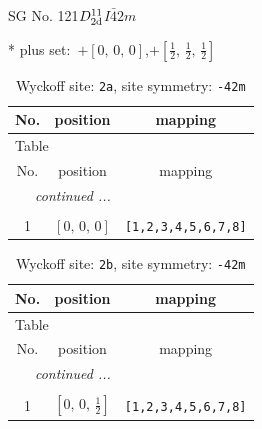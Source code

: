 \documentclass[fleqn,8pt]{jsarticle}
\begin{document}
\setcounter{MaxMatrixCols}{32}

\renewcommand{\tablename}{Table~}
\renewcommand{\figurename}{Figure~}
\begin{center}
\LARGE
SG No. 121\quad$D_{\rm 2d}^{11}$\quad$I\bar{4}2m$\quad[ tetragonal ]
\end{center}
* plus set:\,\,\,$+\left[ 0,\, 0,\, 0 \right]$,\quad $+\left[ \frac{1}{2},\, \frac{1}{2},\, \frac{1}{2} \right]$
\renewcommand{\arraystretch}{1.2}
\begin{longtable}{ccc}
\caption{Wyckoff site: {\tt 2a}, site symmetry: {\tt -42m}}
 \\
 \hline \hline
No. & position & mapping \\ \hline \endfirsthead

\multicolumn{2}{l}{\tablename\ \thetable{}} \\
 \hline \hline
No. & position & mapping \\ \hline \endhead

 \hline \hline
\multicolumn{2}{r}{\footnotesize\it continued ...} \\ \endfoot

 \hline \hline
\multicolumn{2}{r}{} \\ \endlastfoot

1 & $\left[ 0,\, 0,\, 0 \right]$ & {\tt [1,2,3,4,5,6,7,8]} \\
\end{longtable}
\renewcommand{\arraystretch}{1.2}
\begin{longtable}{ccc}
\caption{Wyckoff site: {\tt 2b}, site symmetry: {\tt -42m}}
 \\
 \hline \hline
No. & position & mapping \\ \hline \endfirsthead

\multicolumn{2}{l}{\tablename\ \thetable{}} \\
 \hline \hline
No. & position & mapping \\ \hline \endhead

 \hline \hline
\multicolumn{2}{r}{\footnotesize\it continued ...} \\ \endfoot

 \hline \hline
\multicolumn{2}{r}{} \\ \endlastfoot

1 & $\left[ 0,\, 0,\, \frac{1}{2} \right]$ & {\tt [1,2,3,4,5,6,7,8]} \\
\end{longtable}
\renewcommand{\arraystretch}{1.2}
\end{document}
